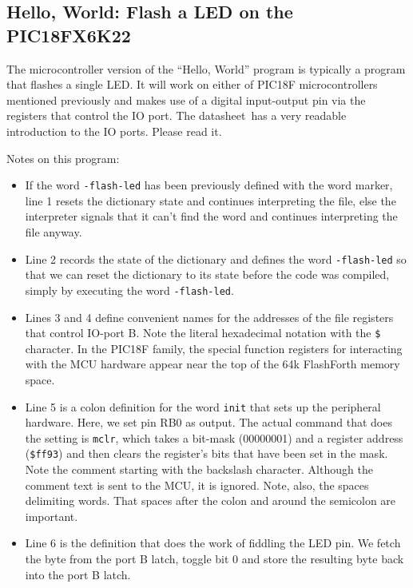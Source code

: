 \documentclass[12pt,a4paper]{article}
\newcommand{\code}[2]{
 \hrulefill
 \scriptsize
 
 \hrulefill
 \vspace{2em}
 \normalsize
}
\begin{document}
\subsection{Hello, World: Flash a LED on the PIC18FX6K22}
%
The microcontroller version of the ``Hello, World'' program is typically a program that
flashes a single LED.
It will work on either of PIC18F microcontrollers mentioned previously and 
makes use of a digital input-output pin via the registers that control the IO port.
The datasheet\,\cite{pic18f26k22-datasheet} has a very readable introduction 
to the IO ports.
Please read it.

\bigskip\noindent
\code{}{../pic18/flash-led-pic18.txt}

\medskip\noindent
Notes on this program:
\begin{itemize}
 \item If the word \verb!-flash-led! has been previously defined with the word marker, 
  line 1 resets the dictionary state and continues interpreting the file, 
  else the interpreter signals that it can't find the word and continues interpreting the file anyway.
 \item Line 2 records the state of the dictionary and defines the word \verb!-flash-led!
  so that we can reset the dictionary to its state before the code was compiled, 
  simply by executing the word \verb!-flash-led!.
 \item Lines 3 and 4 define convenient names for the addresses of the file registers 
  that control IO-port B.
  Note the literal hexadecimal notation with the \verb!$! character.
  In the PIC18F family, the special function registers for interacting with the 
  MCU hardware appear near the top of the 64k FlashForth memory space.
 \item Line 5 is a colon definition for the word \verb!init! that sets up the peripheral
  hardware.  
  Here, we set pin RB0 as output.
  The actual command that does the setting is \verb!mclr!,
  which takes a bit-mask (00000001) and a register address (\verb!$ff93!)
  and then clears the register's bits that have been set in the mask.
  Note the comment starting with the backslash character. 
  Although the comment text is sent to the MCU, it is ignored.
  Note, also, the spaces delimiting words.  That spaces after the colon and
  around the semicolon are important.
 \item Line 6 is the definition that does the work of fiddling the LED pin.
  We fetch the byte from the port B latch, toggle bit 0 and 
  store the resulting byte back into the port B latch.

\end{itemize}
\end{document}
